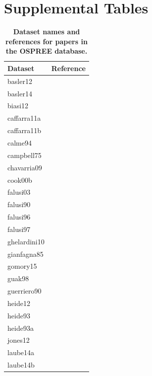 \documentclass{article}
\begin{document}
\section* {Supplemental Tables}
\newpage
\begin{footnotesize} 

\begingroup\footnotesize
\begin{longtable}{p{}p{}}
\caption{\textbf{Dataset names and references for papers in the OSPREE database.}} \\ 
  \hline
Dataset & Reference \\ 
  \hline \endhead  \hline
basler12 & \citep{Basler:2012} \\ 
  basler14 & \citep{Basler:2014aa} \\ 
  biasi12 & \citep{Biasi:2012} \\ 
  caffarra11a & \citep{Caffarra:2011a} \\ 
  caffarra11b & \citep{Caffarra:2011b} \\ 
  calme94 & \citep{Calme:1994aa} \\ 
  campbell75 & \citep{Campbell:1975aa} \\ 
  chavarria09 & \citep{Chavarria:2009aa} \\ 
  cook00b & \citep{Cook:2000aa} \\ 
  falusi03 & \citep{Falusi:2003aa} \\ 
  falusi90 & \citep{Falusi:1990aa} \\ 
  falusi96 & \citep{Falusi:1996aa} \\ 
  falusi97 & \citep{Falusi:1997aa} \\ 
  ghelardini10 & \citep{Ghelardini:2010aa} \\ 
  gianfagna85 & \citep{Gianfagna:1985aa} \\ 
  gomory15 & \citep{Gomory:2015aa} \\ 
  guak98 & \citep{Guak:1998aa} \\ 
  guerriero90 & \citep{guerriero:1990} \\ 
  heide12 & \citep{Heide:2012aa} \\ 
  heide93 & \citep{Heide:1993} \\ 
  heide93a & \citep{Heide:1993a} \\ 
  jones12 & \citep{Jones:2012} \\ 
  laube14a & \citep{Laube:2014a} \\ 
  laube14b & \citep{Laube:2014b} \\ 

\end{longtable}
\end{footnotesize}
\end{document}
